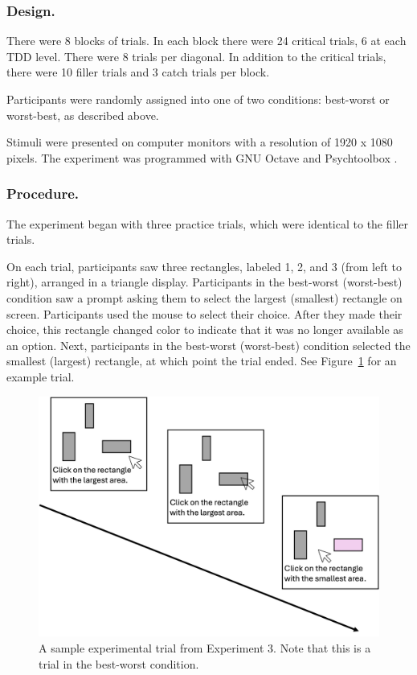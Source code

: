\subsubsection{Design.}
There were 8 blocks of trials. In each block there were 24 critical trials, 6 at each TDD level. There were 8 trials per diagonal. In addition to the critical trials, there were 10 filler trials and 3 catch trials per block.

Participants were randomly assigned into one of two conditions: best-worst or worst-best, as described above. 

Stimuli were presented on computer monitors with a resolution of 1920 x 1080 pixels. The experiment was programmed with GNU Octave and Psychtoolbox \parencite{octave,brainardPsychophysicsToolbox1997}. 

\subsubsection{Procedure.}

The experiment began with three practice trials, which were identical to the filler trials. 

On each trial, participants saw three rectangles, labeled 1, 2, and 3 (from left to right), arranged in a triangle display. Participants in the best-worst (worst-best) condition saw a prompt asking them to select the largest (smallest) rectangle on screen. Participants used the mouse to select their choice. After they made their choice, this rectangle changed color to indicate that it was no longer available as an option. Next, participants in the best-worst (worst-best) condition selected the smallest (largest) rectangle, at which point the trial ended. See Figure~\ref{fig:bw_example_trial} for an example trial.

\begin{figure}
   \includegraphics[width=\linewidth]{figures/bw_design_fig.jpg}
   \caption{A sample experimental trial from Experiment 3. Note that this is a trial in the best-worst condition.}
   \label{fig:bw_example_trial}
 \end{figure}
 
